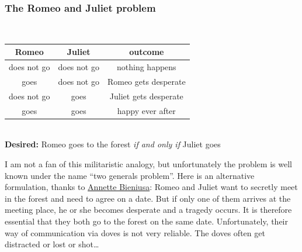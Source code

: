 \begin{frame}
    \label{s:romeo-juliet}
    \frametitle{The Romeo and Juliet problem}
    \begin{center}
        \\[1em]\pause
        \renewcommand{\arraystretch}{1.3}
        \begin{tabular}{c|c|c}
            \hline
            \textbf{Romeo} & \textbf{Juliet} & \textbf{outcome} \\\hline
            does not go & does not go & nothing happens \\
            goes & does not go & Romeo gets desperate \\
            does not go & goes & Juliet gets desperate \\
            goes & goes & happy ever after \\\hline
        \end{tabular}\\[1em]
        \textbf{Desired:} Romeo goes to the forest \emph{if and only if} Juliet goes
    \end{center}
\end{frame}
\label{l:romeo-juliet}

I am not a fan of this militaristic analogy, but unfortunately the problem is well known under the name ``two generals problem''.
Here is an alternative formulation, thanks to \href{https://twitter.com/anne_biene/status/1386975750671187970}{Annette Bieniusa}:
Romeo and Juliet want to secretly meet in the forest and need to agree on a date.
But if only one of them arrives at the meeting place, he or she becomes desperate and a tragedy occurs.
It is therefore essential that they both go to the forest on the same date.
Unfortunately, their way of communication via doves is not very reliable.
The doves often get distracted or lost or shot\dots

